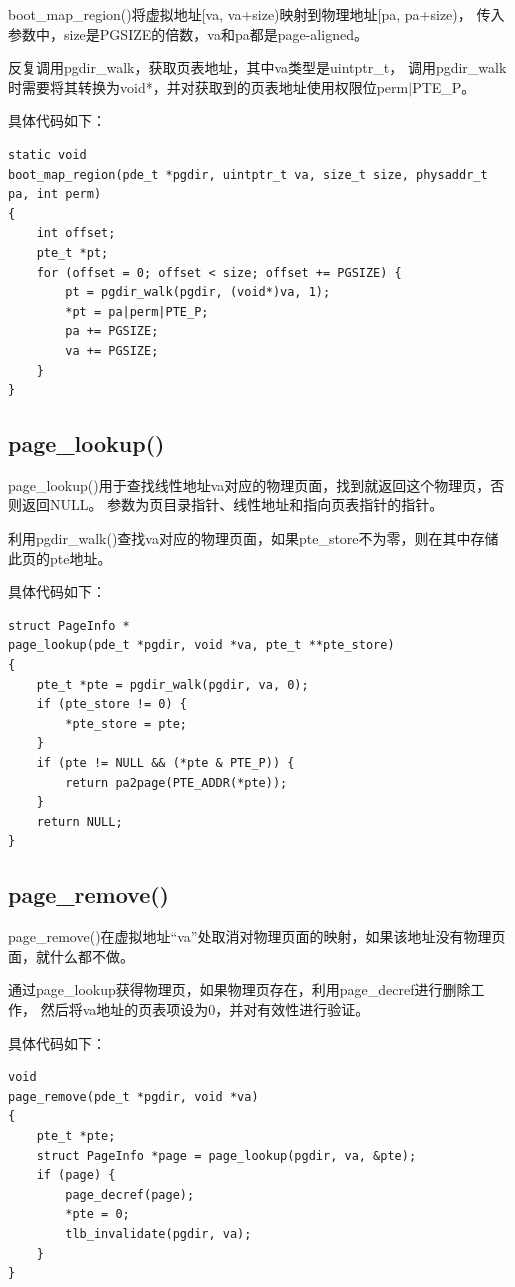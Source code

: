 \documentclass[12pt,a4paper,UTF8]{article}
\begin{document}
    boot\_map\_region()将虚拟地址[va, va+size)映射到物理地址[pa, pa+size)，
    传入参数中，size是PGSIZE的倍数，va和pa都是page-aligned。
    
    反复调用pgdir\_walk，获取页表地址，其中va类型是uintptr\_t，
    调用pgdir\_walk时需要将其转换为void*，并对获取到的页表地址使用权限位perm$|$PTE\_P。

    具体代码如下：
    \begin{lstlisting}[style=CPP]
static void
boot_map_region(pde_t *pgdir, uintptr_t va, size_t size, physaddr_t pa, int perm)
{
	int offset;
    pte_t *pt;
    for (offset = 0; offset < size; offset += PGSIZE) {
        pt = pgdir_walk(pgdir, (void*)va, 1);
        *pt = pa|perm|PTE_P;
        pa += PGSIZE;
        va += PGSIZE;
   	}
}
    \end{lstlisting}

    \subsection{page\_lookup()}

    page\_lookup()用于查找线性地址va对应的物理页面，找到就返回这个物理页，否则返回NULL。
    参数为页目录指针、线性地址和指向页表指针的指针。

    利用pgdir\_walk()查找va对应的物理页面，如果pte\_store不为零，则在其中存储此页的pte地址。

    具体代码如下：
    \begin{lstlisting}[style=CPP]
struct PageInfo *
page_lookup(pde_t *pgdir, void *va, pte_t **pte_store)
{
	pte_t *pte = pgdir_walk(pgdir, va, 0);
   	if (pte_store != 0) {
        *pte_store = pte;
   	}
   	if (pte != NULL && (*pte & PTE_P)) {
      	return pa2page(PTE_ADDR(*pte));
   	}
	return NULL;
}
    \end{lstlisting}

    \subsection{page\_remove()}

    page\_remove()在虚拟地址“va”处取消对物理页面的映射，如果该地址没有物理页面，就什么都不做。
    
    通过page\_lookup获得物理页，如果物理页存在，利用page\_decref进行删除工作，
    然后将va地址的页表项设为0，并对有效性进行验证。
    
    具体代码如下：

    \begin{lstlisting}[style=CPP]
void
page_remove(pde_t *pgdir, void *va)
{
 	pte_t *pte;
    struct PageInfo *page = page_lookup(pgdir, va, &pte);
    if (page) {
        page_decref(page);
        *pte = 0;
        tlb_invalidate(pgdir, va);
    }
}
    \end{lstlisting}
\end{document}
